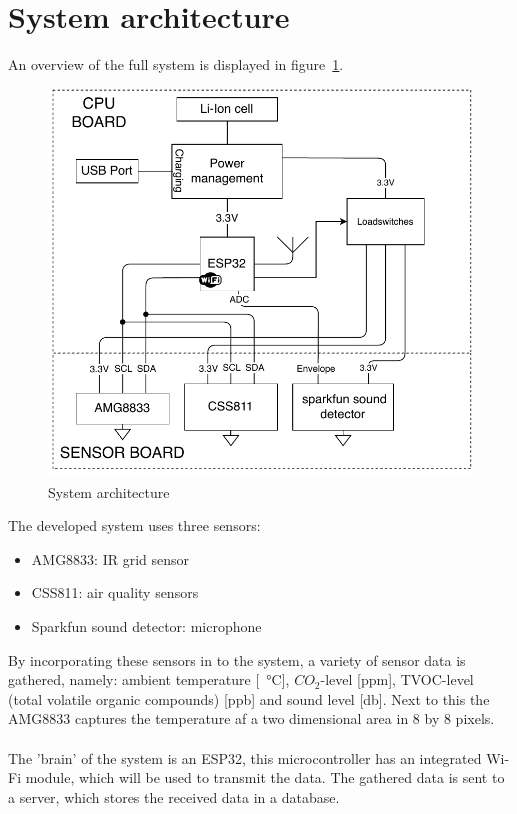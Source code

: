 \documentclass[11pt,a4paper]{article}
\begin{document}
\section{System architecture}
An overview of the full system is displayed in figure~\ref{fig:architecture}.
\begin{figure}[!ht]
	\centering
	\includegraphics[width=1.0\linewidth]{architecture.pdf}
	\caption{System architecture}
	\label{fig:architecture}
\end{figure}
The developed system uses three sensors: 
\begin{itemize}
	\item AMG8833: IR grid sensor
	\item CSS811: air quality sensors
	\item Sparkfun sound detector: microphone
\end{itemize}
By incorporating these sensors in to the system, a variety of sensor data is gathered, namely: ambient temperature [\SI{}{\celsius}], $CO_2$-level [ppm], TVOC-level (total volatile organic compounds) [ppb] and sound level [db]. Next to this the AMG8833 captures the temperature af a two dimensional area in 8 by 8 pixels. 
\\ \\
The 'brain' of the system is an ESP32, this microcontroller has an integrated Wi-Fi module, which will be used to transmit the data. The gathered data is sent to a server, which stores the received data in a database. 
\end{document}
